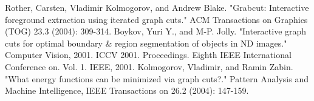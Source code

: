 \documentclass[a4paper]{article}
\begin{document}
\begin{thebibliography}{10}

 Rother, Carsten, Vladimir Kolmogorov, and Andrew Blake. "Grabcut: Interactive foreground extraction using iterated graph cuts." ACM Transactions on Graphics (TOG) 23.3 (2004): 309-314.
 Boykov, Yuri Y., and M-P. Jolly. "Interactive graph cuts for optimal boundary \& region segmentation of objects in ND images." Computer Vision, 2001. ICCV 2001. Proceedings. Eighth IEEE International Conference on. Vol. 1. IEEE, 2001.
 Kolmogorov, Vladimir, and Ramin Zabin. "What energy functions can be minimized via graph cuts?." Pattern Analysis and Machine Intelligence, IEEE Transactions on 26.2 (2004): 147-159.
\end{thebibliography}
\end{document}
